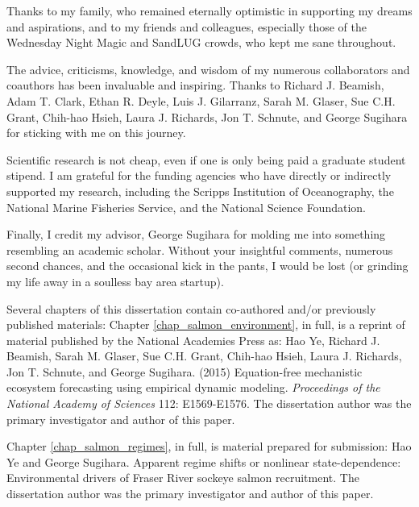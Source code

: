 \documentclass[12pt,chapterheads]{ucsd}
\begin{document}
\begin{frontmatter}
\tableofcontents
\listofsuppfiles
\listoffigures  %
\listoftables   %


\begin{acknowledgements} 
Thanks to my family, who remained eternally optimistic in supporting my dreams and aspirations, and to my friends and colleagues, especially those of the Wednesday Night Magic and SandLUG crowds, who kept me sane throughout.

The advice, criticisms, knowledge, and wisdom of my numerous collaborators and coauthors has been invaluable and inspiring. Thanks to Richard J. Beamish, Adam T. Clark, Ethan R. Deyle, Luis J. Gilarranz, Sarah M. Glaser, Sue C.H. Grant, Chih-hao Hsieh, Laura J. Richards, Jon T. Schnute, and George Sugihara for sticking with me on this journey.

Scientific research is not cheap, even if one is only being paid a graduate student stipend. I am grateful for the funding agencies who have directly or indirectly supported my research, including the Scripps Institution of Oceanography, the National Marine Fisheries Service, and the National Science Foundation.

Finally, I credit my advisor, George Sugihara for molding me into something resembling an academic scholar. Without your insightful comments, numerous second chances, and the occasional kick in the pants, I would be lost (or grinding my life away in a soulless bay area startup).

Several chapters of this dissertation contain co-authored and/or previously published materials:
Chapter \ref{chap_salmon_environment}, in full, is a reprint of material published by the National Academies Press as: Hao Ye, Richard J. Beamish, Sarah M. Glaser, Sue C.H. Grant, Chih-hao Hsieh, Laura J. Richards, Jon T. Schnute, and George Sugihara. (2015) Equation-free mechanistic ecosystem forecasting using empirical dynamic modeling. \emph{Proceedings of the National Academy of Sciences} 112: E1569-E1576. The dissertation author was the primary investigator and author of this paper.

Chapter \ref{chap_salmon_regimes}, in full, is material prepared for submission: Hao Ye and George Sugihara. Apparent regime shifts or nonlinear state-dependence: Environmental drivers of Fraser River sockeye salmon recruitment. The dissertation author was the primary investigator and author of this paper.


\end{acknowledgements}
\end{frontmatter}
\end{document}
